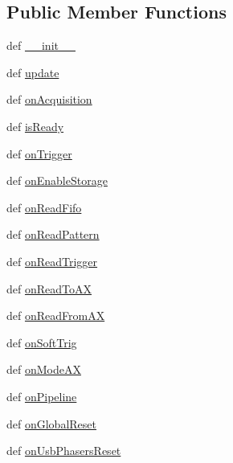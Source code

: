 \subsection*{Public Member Functions}
\begin{DoxyCompactItemize}
\item 
def \hyperlink{classProtoFEB__v1_1_1ProtoFEB__v1_a4fe76cce14ea6f67a0b32d45a92ab577}{\_\-\_\-init\_\-\_\-}
\item 
def \hyperlink{classProtoFEB__v1_1_1ProtoFEB__v1_a1b2e248189d0cc03eb7666100dbe1280}{update}
\item 
def \hyperlink{classProtoFEB__v1_1_1ProtoFEB__v1_a71c6d3a351a4aa0d39d1888b679466e7}{onAcquisition}
\item 
def \hyperlink{classProtoFEB__v1_1_1ProtoFEB__v1_a031fbbb17ded0f3312a237b7c0d29305}{isReady}
\item 
def \hyperlink{classProtoFEB__v1_1_1ProtoFEB__v1_a0aeaa7877d9e24260c3d4239845f2b4c}{onTrigger}
\item 
def \hyperlink{classProtoFEB__v1_1_1ProtoFEB__v1_a83c1e6f881f44cd0ccd19d6df21a02f9}{onEnableStorage}
\item 
def \hyperlink{classProtoFEB__v1_1_1ProtoFEB__v1_a87e1d49a8627f6092b24ee89615c66d3}{onReadFifo}
\item 
def \hyperlink{classProtoFEB__v1_1_1ProtoFEB__v1_a7427823cf45ae9ef080644389c65eb49}{onReadPattern}
\item 
def \hyperlink{classProtoFEB__v1_1_1ProtoFEB__v1_a4144ba8a2f2a74f29d1ef9f5baec0e57}{onReadTrigger}
\item 
def \hyperlink{classProtoFEB__v1_1_1ProtoFEB__v1_a709904a542a51fba791ca267d03a62c8}{onReadToAX}
\item 
def \hyperlink{classProtoFEB__v1_1_1ProtoFEB__v1_a3245fdcfbb7727e9da4aeb481355b8c0}{onReadFromAX}
\item 
def \hyperlink{classProtoFEB__v1_1_1ProtoFEB__v1_aeacb09d0b459c2fb2aa662358c29ef27}{onSoftTrig}
\item 
def \hyperlink{classProtoFEB__v1_1_1ProtoFEB__v1_ac62afe73a8e95b214fc48701307d0a5f}{onModeAX}
\item 
def \hyperlink{classProtoFEB__v1_1_1ProtoFEB__v1_a6d345e643ca8673d761aea4830cc40c5}{onPipeline}
\item 
def \hyperlink{classProtoFEB__v1_1_1ProtoFEB__v1_aa47e9d0b2e8282ee4ae9e8c5c99e11d9}{onGlobalReset}
\item 
def \hyperlink{classProtoFEB__v1_1_1ProtoFEB__v1_aa90a777d0cd810c0fab236d3fb29429c}{onUsbPhasersReset}
\item 

\end{DoxyCompactItemize}
